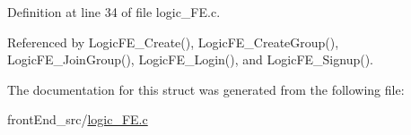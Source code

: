 Definition at line 34 of file logic\+\_\+\+F\+E.\+c.



Referenced by Logic\+F\+E\+\_\+\+Create(), Logic\+F\+E\+\_\+\+Create\+Group(), Logic\+F\+E\+\_\+\+Join\+Group(), Logic\+F\+E\+\_\+\+Login(), and Logic\+F\+E\+\_\+\+Signup().



The documentation for this struct was generated from the following file\+:\begin{DoxyCompactItemize}
\item 
front\+End\+\_\+src/\hyperlink{logic__FE_8c}{logic\+\_\+\+F\+E.\+c}\end{DoxyCompactItemize}
